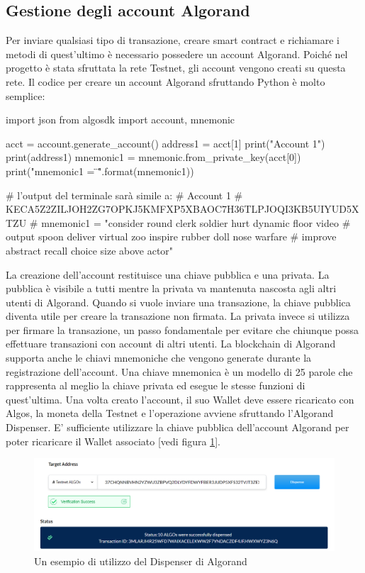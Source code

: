 \subsection{Gestione degli account Algorand}
Per inviare qualsiasi tipo di transazione, creare smart contract e richiamare i metodi di quest'ultimo è necessario possedere un account Algorand. Poiché nel progetto è stata sfruttata la rete Testnet, gli account vengono creati su questa rete. Il codice per creare un account Algorand sfruttando Python è molto semplice:
\begin{pythoncode}
import json
from algosdk import account, mnemonic

acct = account.generate_account()
address1 = acct[1]
print("Account 1")
print(address1)
mnemonic1 = mnemonic.from_private_key(acct[0])
print("mnemonic1 = \"{}\"".format(mnemonic1))

# l'output del terminale sarà simile a:
# Account 1
# KECA5Z2ZILJOH2ZG7OPKJ5KMFXP5XBAOC7H36TLPJOQI3KB5UIYUD5XTZU
# mnemonic1 = "consider round clerk soldier hurt dynamic floor video
# output spoon deliver virtual zoo inspire rubber doll nose warfare 
# improve abstract recall choice size above actor"
\end{pythoncode}
La creazione dell'account restituisce una chiave pubblica e una privata. La pubblica è visibile a tutti mentre la privata va mantenuta nascosta agli altri utenti di Algorand. Quando si vuole inviare una transazione, la chiave pubblica diventa utile per creare la transazione non firmata. La privata invece si utilizza per firmare la transazione, un passo fondamentale per evitare che chiunque possa effettuare transazioni con account di altri utenti. La blockchain di Algorand supporta anche le chiavi mnemoniche che vengono generate durante la registrazione dell'account. Una chiave mnemonica è un modello di 25 parole che rappresenta al meglio la chiave privata ed esegue le stesse funzioni di quest'ultima. Una volta creato l'account, il suo Wallet deve essere ricaricato con Algos, la moneta della Testnet e l'operazione avviene sfruttando l'Algorand Dispenser. E' sufficiente utilizzare la chiave pubblica dell'account Algorand per poter ricaricare il Wallet associato [vedi figura \ref{fig: dispenseralgorand}].
\begin{figure}[!h]
\centering
\includegraphics[scale=0.5]{images/algorand_dispenser.png}
\caption{Un esempio di utilizzo del Dispenser di Algorand}
\label{fig: dispenseralgorand}
\end{figure}
